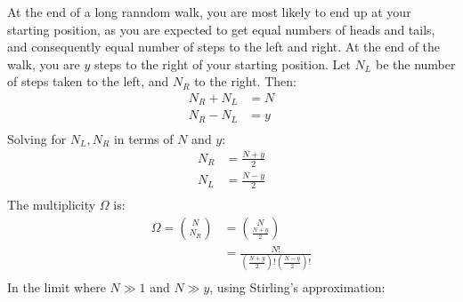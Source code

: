 \documentclass{article}
\begin{document}
At the end of a long ranndom walk, you are most likely to end up at your starting position, as you are expected to get equal numbers of heads and tails, and consequently equal number of steps to the left and right.
At the end of the walk, you are $y$ steps to the right of your starting position. Let $N_L$ be the number of steps taken to the left, and $N_R$ to the right. Then:
\begin{equation}
    \begin{split}
        N_R + N_L & = N \\
        N_R - N_L & = y \\
    \end{split}
\end{equation}
Solving for $N_L, N_R$ in terms of $N$ and $y$:
\begin{equation}
    \begin{split}
        N_R & = \frac{N + y}{2} \\
        N_L & = \frac{N - y}{2} \\
    \end{split}
\end{equation}
The multiplicity $\Omega$ is:
\begin{equation}
    \begin{split}
        \Omega = {N \choose N_R} & = {N \choose \frac{N + y}{2}} \\
        & = \frac{N!}{(\frac{N + y}{2})!(\frac{N - y}{2})!} \\
    \end{split}
\end{equation}
In the limit where $N \gg 1$ and $N \gg y$, using Stirling's approximation:
\end{document}
